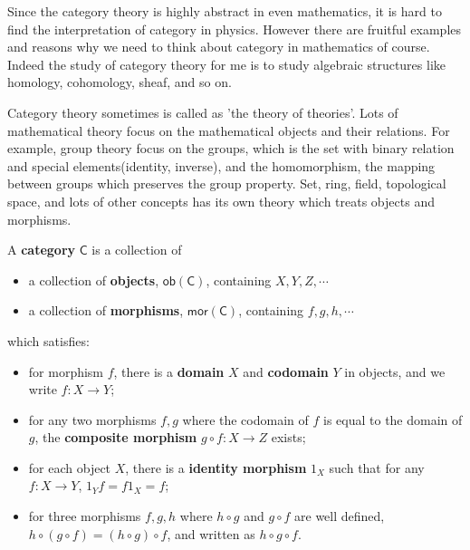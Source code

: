 Since the category theory is highly abstract in even mathematics, it is hard to find the interpretation of category in physics. However there are fruitful examples and reasons why we need to think about category in mathematics of course. Indeed the study of category theory for me is to study algebraic structures like homology, cohomology, sheaf, and so on.

Category theory sometimes is called as 'the theory of theories'. Lots of mathematical theory focus on the mathematical objects and their relations. For example, group theory focus on the groups, which is the set with binary relation and special elements(identity, inverse), and the homomorphism, the mapping between groups which preserves the group property. Set, ring, field, topological space, and lots of other concepts has its own theory which treats objects and morphisms.

\begin{defn} A \textbf{category} $\mathsf{C}$ is a collection of
\begin{itemize}
\item a collection of \textbf{objects}, $\mathsf{ob}(\mathsf{C})$, containing $X,Y,Z,\cdots$
\item a collection of \textbf{morphisms}, $\mathsf{mor}(\mathsf{C})$, containing $f,g,h,\cdots$
\end{itemize}
which satisfies:
\begin{itemize}
\item for morphism $f$, there is a \textbf{domain} $X$ and \textbf{codomain} $Y$ in objects, and we write $f:X\rightarrow Y$;
\item for any two morphisms $f,g$ where the codomain of $f$ is equal to the domain of $g$, the \textbf{composite morphism} $g\circ f:X\rightarrow Z$ exists;
\item for each object $X$, there is a \textbf{identity morphism} $1_X$ such that for any $f:X\rightarrow Y$, $1_Y f=f 1_X=f$;
\item for three morphisms $f,g,h$ where $h\circ g$ and $g\circ f$ are well defined, $h\circ(g\circ f)=(h\circ g)\circ f$, and written as $h\circ g\circ f$.
\end{itemize}
\end{defn}

